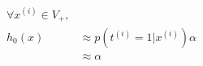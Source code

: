 \begin{answer}
    $$
    \begin{aligned}
        \forall x^{(i)} \in V_{+},\\
        h_0(x) &\approx p(t^{(i)} = 1 | x^{(i)})\alpha\\
        &\approx \alpha
    \end{aligned}
    $$
\end{answer}
